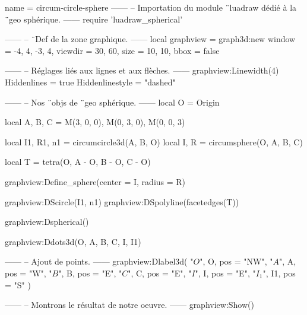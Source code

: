 \documentclass[border = 3pt]{standalone}
\begin{document}
\begin{luadraw*}{name = circum-circle-sphere}
------
-- Importation du module ¨luadraw dédié à la ¨geo sphérique.
------
require 'luadraw_spherical'

------
-- ¨Def de la zone graphique.
------
local graphview = graph3d:new{
  window  = {-4, 4, -3, 4},
  viewdir = {30, 60},
  size    = {10, 10},
  bbox    = false
}

------
-- Réglages liés aux lignes et aux flèches.
------
graphview:Linewidth(4)
Hiddenlines     = true
Hiddenlinestyle = "dashed"

------
-- Nos ¨objs de ¨geo sphérique.
------
local O = Origin

local A, B, C = M(3, 0, 0), M(0, 3, 0), M(0, 0, 3)

local I1, R1, n1 = circumcircle3d(A, B, O)
local I, R       = circumsphere(O, A, B, C)

local T = tetra(O, A - O, B - O, C - O)

graphview:Define_sphere({center = I, radius = R})

graphview:DScircle({I1, n1})
graphview:DSpolyline(facetedges(T))

graphview:Dspherical()

graphview:Ddots3d({O, A, B, C, I, I1})

------
-- Ajout de points.
------
graphview:Dlabel3d(
  "$O$", O, {pos = "NW"},
  "$A$", A, {pos = "W"},
  "$B$", B, {pos = "E"},
  "$C$", C, {pos = "E"},
  "$I$", I, {pos = "E"},
  "$I_1$", I1, {pos = "S"}
)

------
-- Montrons le résultat de notre oeuvre.
------
graphview:Show()
\end{luadraw*}
\end{document}
